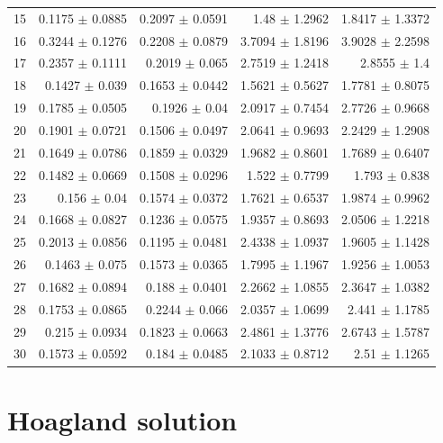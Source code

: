 \begin{table}[ht]
\begin{tabular}{lrrrr}
  15 & 0.1175 $\pm$ 0.0885 & 0.2097 $\pm$ 0.0591 & 1.48 $\pm$ 1.2962 & 1.8417 $\pm$ 1.3372 \\ 
  16 & 0.3244 $\pm$ 0.1276 & 0.2208 $\pm$ 0.0879 & 3.7094 $\pm$ 1.8196 & 3.9028 $\pm$ 2.2598 \\ 
  17 & 0.2357 $\pm$ 0.1111 & 0.2019 $\pm$ 0.065 & 2.7519 $\pm$ 1.2418 & 2.8555 $\pm$ 1.4 \\ 
  18 & 0.1427 $\pm$ 0.039 & 0.1653 $\pm$ 0.0442 & 1.5621 $\pm$ 0.5627 & 1.7781 $\pm$ 0.8075 \\ 
  19 & 0.1785 $\pm$ 0.0505 & 0.1926 $\pm$ 0.04 & 2.0917 $\pm$ 0.7454 & 2.7726 $\pm$ 0.9668 \\ 
  20 & 0.1901 $\pm$ 0.0721 & 0.1506 $\pm$ 0.0497 & 2.0641 $\pm$ 0.9693 & 2.2429 $\pm$ 1.2908 \\ 
  21 & 0.1649 $\pm$ 0.0786 & 0.1859 $\pm$ 0.0329 & 1.9682 $\pm$ 0.8601 & 1.7689 $\pm$ 0.6407 \\ 
  22 & 0.1482 $\pm$ 0.0669 & 0.1508 $\pm$ 0.0296 & 1.522 $\pm$ 0.7799 & 1.793 $\pm$ 0.838 \\ 
  23 & 0.156 $\pm$ 0.04 & 0.1574 $\pm$ 0.0372 & 1.7621 $\pm$ 0.6537 & 1.9874 $\pm$ 0.9962 \\ 
  24 & 0.1668 $\pm$ 0.0827 & 0.1236 $\pm$ 0.0575 & 1.9357 $\pm$ 0.8693 & 2.0506 $\pm$ 1.2218 \\ 
  25 & 0.2013 $\pm$ 0.0856 & 0.1195 $\pm$ 0.0481 & 2.4338 $\pm$ 1.0937 & 1.9605 $\pm$ 1.1428 \\ 
  26 & 0.1463 $\pm$ 0.075 & 0.1573 $\pm$ 0.0365 & 1.7995 $\pm$ 1.1967 & 1.9256 $\pm$ 1.0053 \\ 
  27 & 0.1682 $\pm$ 0.0894 & 0.188 $\pm$ 0.0401 & 2.2662 $\pm$ 1.0855 & 2.3647 $\pm$ 1.0382 \\ 
  28 & 0.1753 $\pm$ 0.0865 & 0.2244 $\pm$ 0.066 & 2.0357 $\pm$ 1.0699 & 2.441 $\pm$ 1.1785 \\ 
  29 & 0.215 $\pm$ 0.0934 & 0.1823 $\pm$ 0.0663 & 2.4861 $\pm$ 1.3776 & 2.6743 $\pm$ 1.5787 \\ 
  30 & 0.1573 $\pm$ 0.0592 & 0.184 $\pm$ 0.0485 & 2.1033 $\pm$ 0.8712 & 2.51 $\pm$ 1.1265 \\ 
   \bottomrule
\end{tabular}
\label{tab:summary_table_all_variables}
\end{table}

\chapter{Hoagland solution}
\label{appendix:hoagland}

